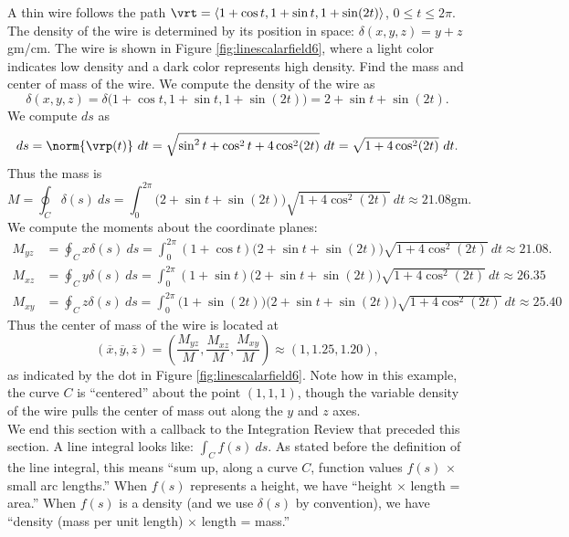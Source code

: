 {A thin wire follows the path $\vrt = \langle 1+\cos t,1+\sin t, 1+ \sin(2t)\rangle$, $0\leq t\leq 2\pi$. The density of the wire is determined by its position in space: $\delta(x,y,z) = y+z$ gm/cm. The wire is shown in Figure \ref{fig:linescalarfield6}, where a light color indicates low density and a dark color represents high density. Find the mass  and center of mass of the wire.
}
{We compute the density of the wire as 
$$\delta(x,y,z) = \delta\big(1+\cos t,1+\sin t, 1+\sin(2t)\big) = 2+\sin t+\sin(2t).$$ We compute $ds$ as
$$ds = \norm{\vrp(t)}\ dt = \sqrt{\sin^2t+\cos^2t+4\cos^2(2t)}\ dt = \sqrt{1+4\cos^2(2t)}\ dt.$$
Thus the mass is
$$M = \oint_C \delta(s)\ ds = \int_0^{2\pi} \big(2+\sin t+\sin(2t)\big)\sqrt{1+4\cos^2(2t)}\ dt \approx 21.08\text{gm}. $$
We compute the moments about the coordinate planes:\small
\begin{align*}
M_{yz} &= \oint_C x\delta(s)\ ds = \int_0^{2\pi}(1+\cos t)\big(2+\sin t+\sin(2t)\big)\sqrt{1+4\cos^2(2t)}\ dt \approx 21.08. \\
M_{xz} &= \oint_C y\delta(s)\ ds = \int_0^{2\pi}(1+\sin t)\big(2+\sin t+\sin(2t)\big)\sqrt{1+4\cos^2(2t)}\ dt \approx
26.35\\
M_{xy} &= \oint_C z\delta(s)\ ds = \int_0^{2\pi}\big(1+\sin(2 t)\big)\big(2+\sin t+\sin(2t)\big)\sqrt{1+4\cos^2(2t)}\ dt \approx 25.40
\end{align*}\normalsize
Thus the center of mass of the wire is located at 
$$(\overline{x},\overline{y},\overline{z}) = \left(\frac{M_{yz}}M, \frac{M_{xz}}M,\frac{M_{xy}}M\right) \approx (1,1.25,1.20),$$
as indicated by the dot in Figure \ref{fig:linescalarfield6}. Note how in this example, the curve $C$ is ``centered'' about the point $(1,1,1)$, though the variable density of the wire pulls the center of mass out along the $y$ and $z$ axes.
}\\

We end this section with a callback to the Integration Review that preceded this section. A line integral looks like: $\int_C f(s)\ ds$. As stated before the definition of the line integral, this means ``sum up, along a curve $C$, function values $f(s)$ $\times$ small arc lengths.'' When $f(s)$ represents a height, we have ``height $\times$ length = area.'' When $f(s)$ is a density (and we use $\delta(s)$ by convention), we have ``density (mass per unit length) $\times$ length = mass.''

